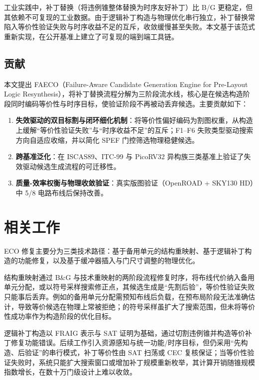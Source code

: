 \documentclass[journal]{IEEEtran}
\begin{document}
工业实践中，补丁替换（将违例锥整体替换为时序友好补丁）比 B/G 更稳定，但其依赖不可复现的工业数据。由于逻辑补丁构造与物理优化串行独立，补丁替换常陷入等价性验证失败与时序收益不足的互斥，收敛缓慢甚至失败。本文基于该范式重新实现，在公开基准上建立了可复现的端到端工具链。

\subsection{贡献}

本文提出 FAECO（Failure-Aware Candidate Generation Engine for Pre-Layout Logic Resynthesis），将补丁替换流程分解为三阶段流水线，核心是在候选构造阶段同时编码等价性与时序目标，使验证阶段不再被动丢弃候选。主要贡献如下：

\begin{enumerate}
  \item \textbf{失效驱动的双目标割与闭环细化机制}：将等价性偏好编码为割图权重，从构造上缓解“等价性验证失败”与“时序收益不足”的互斥；F1--F6 失败类型驱动搜索方向自适应收缩，并以简化 SPEF 门控筛选物理稳健候选。
  \item \textbf{跨基准泛化}：在 ISCAS89、ITC-99 与 PicoRV32 异构族三类基准上验证了失效驱动候选生成流程的可迁移性。
  \item \textbf{质量-效率权衡与物理收敛验证}：真实版图验证（OpenROAD + SKY130 HD）中 5/8 电路布线后保持改善。
\end{enumerate}

\section{相关工作}

ECO 修复主要分为三类技术路径：基于备用单元的结构重映射、基于逻辑补丁构造的功能修复，以及基于缓冲器插入与门尺寸调整的物理优化。

结构重映射通过 B\&G 与技术重映射的两阶段流程修复时序，将布线代价纳入备用单元分配\cite{ho2010eco,ho2012treco}，或以符号采样搜索修正点\cite{kravets2019symbolic}，其候选生成是“先割后验”，等价性验证失败只能事后丢弃。例如\cite{ho2010eco}的备用单元分配需预知布线后负载，在预布局阶段无法准确估计，导致等价候选在物理上常被拒绝；\cite{kravets2019symbolic}的符号采样虽扩大了搜索范围，但未将等价性成功率作为构造阶段的优化目标。

逻辑补丁构造以 FRAIG 表示与 SAT 证明为基础，通过切割违例锥并构造等价补丁修复功能错误\cite{jiang2010fraig,jiang2016resource}。后续工作引入资源感知\cite{jiang2016resource}与统一功能/时序目标\cite{lin2011simult,luo2016unified}，但仍采用“先构造、后验证”的串行模式，补丁等价性由 SAT 扫荡或 CEC 复核保证\cite{mishchenko2006sat,zhong2024stp}；当等价性验证失败时，系统只能扩大搜索窗口或增加补丁规模重新枚举\cite{zhuo2018patch}，其计算开销随锥规模指数增长，在数十万门级设计上难以收敛。
\end{document}
